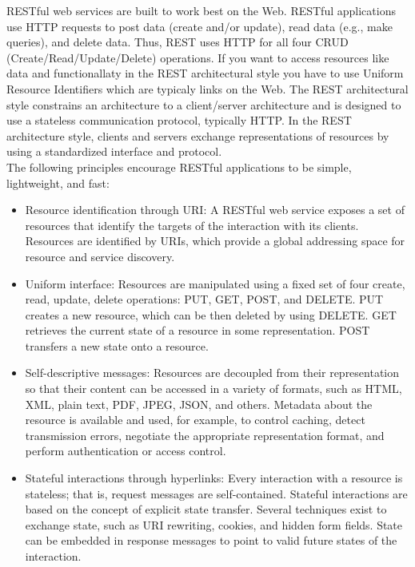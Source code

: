 \documentclass[12pt]{article}
\begin{document}
RESTful web services are built to work best on the Web. RESTful applications use HTTP requests to post data (create and/or update), read data (e.g., make queries), and delete data. Thus, REST uses HTTP for all four CRUD (Create/Read/Update/Delete) operations. If you want to access resources like data and functionallaty in the REST architectural style you have to use Uniform Resource Identifiers which are typicaly links 
on the Web. The REST architectural style constrains an architecture to a client/server architecture and is designed to use a stateless communication protocol, typically HTTP. In the REST architecture style, clients and servers exchange representations of resources by using a standardized interface and protocol. \\
The following principles encourage RESTful applications to be simple, lightweight, and fast:
\\
\begin{itemize}
\item Resource identification through URI: 
A RESTful web service exposes a set of resources that identify the targets of the interaction with its clients. Resources are identified by URIs, which provide a global addressing space for resource and service discovery.\\
\item Uniform interface: 
Resources are manipulated using a fixed set of four create, read, update, delete operations: PUT, GET, POST, and DELETE. PUT creates a new resource, which can be then deleted by using DELETE. GET retrieves the current state of a resource in some representation. POST transfers a new state onto a resource.\\
\item Self-descriptive messages: 
Resources are decoupled from their representation so that their content can be accessed in a variety of formats, such as HTML, XML, plain text, PDF, JPEG, JSON, and others. Metadata about the resource is available and used, for example, to control caching, detect transmission errors, negotiate the appropriate representation format, and perform authentication or access control. \\
\item Stateful interactions through hyperlinks:
Every interaction with a resource is stateless; that is, request messages are self-contained. Stateful interactions are based on the concept of explicit state transfer. Several techniques exist to exchange state, such as URI rewriting, cookies, and hidden form fields. State can be embedded in response messages to point to valid future states of the interaction.\\
\end{itemize}
\end{document}
